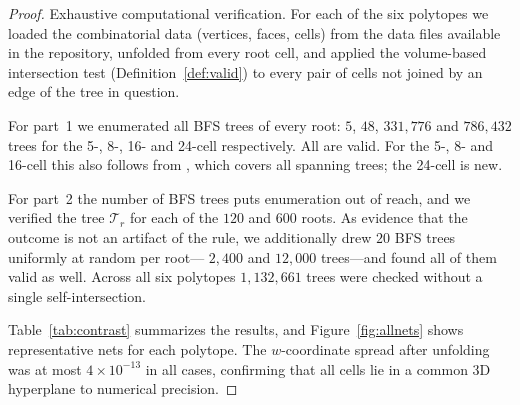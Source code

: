 \documentclass[11pt,letterpaper]{article}
\begin{document}
\begin{proof}
Exhaustive computational verification.
For each of the six polytopes we loaded the combinatorial data
(vertices, faces, cells) from the data files available in the
repository, unfolded from every root cell, and applied the
volume-based intersection test (Definition~\ref{def:valid}) to every
pair of cells not joined by an edge of the tree in question.

For part~1 we enumerated all BFS trees of every root: $5$, $48$,
$331{,}776$ and $786{,}432$ trees for the 5-, 8-, 16- and 24-cell
respectively.
All are valid.
For the 5-, 8- and 16-cell this also follows from
\cite{DevadossHarvey2022}, which covers all spanning trees; the
24-cell is new.

For part~2 the number of BFS trees puts enumeration out of reach, and
we verified the tree $\mathcal{T}_r$ for each of the $120$ and $600$ roots.
As evidence that the outcome is not an artifact of the rule, we
additionally drew $20$ BFS trees uniformly at random per root---
$2{,}400$ and $12{,}000$ trees---and found all of them valid as well.
Across all six polytopes $1{,}132{,}661$ trees were checked without a
single self-intersection.

Table~\ref{tab:contrast} summarizes the results, and
Figure~\ref{fig:allnets} shows representative nets for each polytope.
The $w$-coordinate spread after unfolding was at most $4\times10^{-13}$
in all cases, confirming that all cells lie in a common 3D hyperplane
to numerical precision.
\end{proof}
\end{document}

